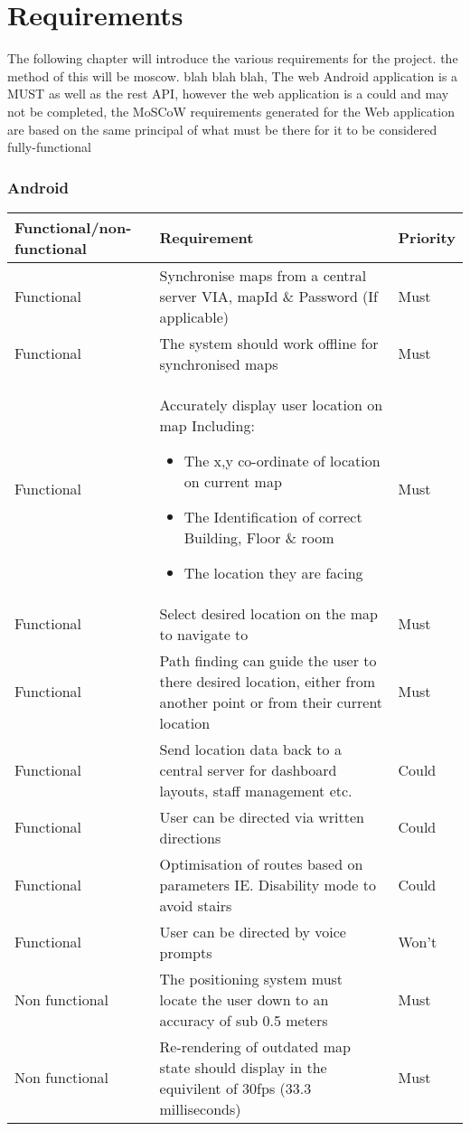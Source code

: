 \section{Requirements}
The following chapter will introduce the various requirements for the project. the method of this will be moscow. blah blah blah, The web Android application is a MUST as well as the rest API, however the web application is a could and may not be completed, the MoSCoW requirements generated for the Web application are based on the same principal of what must be there for it to be considered fully-functional

\subsubsection{Android}
{\renewcommand{\arraystretch}{1.5}%
\begin{tabular}{| p{} | p{} | p{}|}
	\hline
	Functional/non-functional & Requirement & Priority\\\hline
	Functional & Synchronise maps from a central server VIA, mapId \& Password (If applicable)& Must\\\hline
	Functional & The system should work offline for synchronised maps & Must\\\hline
	Functional & 
		Accurately display user location on map Including:
			\begin{itemize}
				\item The x,y co-ordinate of location on current map
				\item The Identification of correct Building, Floor \& room
				\item The location they are facing
			\end{itemize}
	 & Must\\\hline
	Functional & Select desired location on the map to navigate to & Must\\\hline
	Functional & Path finding can guide the user to there desired location, either from another point or from their current location & Must\\\hline
	Functional & Send location data back to a central server for dashboard layouts, staff management etc. & Could\\\hline
	Functional & User can be directed via written directions & Could\\\hline
	Functional & Optimisation of routes based on parameters IE. Disability mode to avoid stairs & Could\\\hline
	Functional & User can be directed by voice prompts & Won't\\\hline
	Non functional & The positioning system must locate the user down to an accuracy of sub 0.5 meters & Must\\\hline
	Non functional & Re-rendering of outdated map state should display in the equivilent of 30fps (33.3 milliseconds) & Must\\\hline


\end{tabular}}
